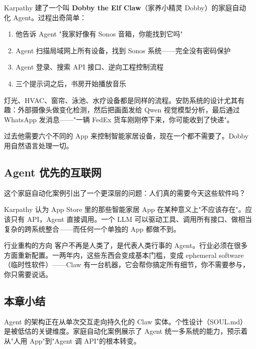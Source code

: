 Karpathy 建了一个叫 \textbf{Dobby the Elf Claw}（家养小精灵 Dobby）的家庭自动化 Agent。过程出奇简单：

\begin{enumerate}
    \item 他告诉 Agent "我家好像有 Sonos 音箱，你能找到它吗"
    \item Agent 扫描局域网上所有设备，找到 Sonos 系统——完全没有密码保护
    \item Agent 登录、搜索 API 接口、逆向工程控制流程
    \item 三个提示词之后，书房开始播放音乐
\end{enumerate}

灯光、HVAC、窗帘、泳池、水疗设备都是同样的流程。安防系统的设计尤其有趣：外部摄像头做变化检测，然后把画面发给 Qwen 视觉模型分析，最后通过 WhatsApp 发消息——"一辆 FedEx 货车刚刚停下来，你可能收到了快递"。

过去他需要六个不同的 App 来控制智能家居设备，现在一个都不需要了。Dobby 用自然语言处理一切。

\subsection{Agent 优先的互联网}

这个家庭自动化案例引出了一个更深层的问题：人们真的需要今天这些软件吗？

Karpathy 认为 App Store 里的那些智能家居 App 在某种意义上"不应该存在"。应该只有 API，Agent 直接调用。一个 LLM 可以驱动工具、调用所有接口、做相当复杂的跨系统整合——而任何一个单独的 App 都做不到。

\begin{importantbox}{行业重构的方向}
客户不再是人类了，是代表人类行事的 Agent。行业必须在很多方面重新配置。一两年内，这些东西会变成基本门槛，变成 ephemeral software（临时性软件）——Claw 有一台机器，它会帮你搞定所有细节，你不需要参与，你只需要说话。
\end{importantbox}

\subsection{本章小结}

Agent 的架构正在从单次交互走向持久化的 Claw 实体。个性设计（SOUL.md）是被低估的关键维度。家庭自动化案例展示了 Agent 统一多系统的能力，预示着从"人用 App"到"Agent 调 API"的根本转变。



